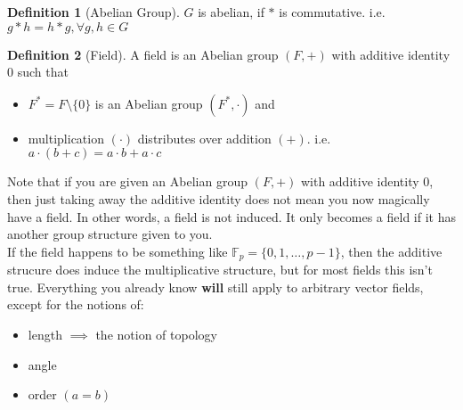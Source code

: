 \documentclass[12pt, a4paper, openany]{report}
\theoremstyle{definition}
\newtheorem{defn}{Definition}
\theoremstyle{remark}
\begin{document}
\begin{defn}[Abelian Group]
    \( G \) is abelian, if \( \ast \) is commutative. i.e. \( g \ast h = h \ast g, \forall g, h \in  G \)

\end{defn}

\begin{defn}[Field]
    A field is an Abelian group \( (F, +) \) with additive identity \( 0 \) such that
    \begin{itemize}
        \item \( F^{*} = F \setminus \{0\} \) is an Abelian group \( (F^{*}, \cdot) \) and
        \item multiplication \( (\cdot) \) distributes over addition \( (+) \). i.e. \( a \cdot (b + c) = a \cdot b + a \cdot c \)
    \end{itemize}
\end{defn}

Note that if you are given an Abelian group \( (F, +) \) with additive identity \( 0 \), then just taking away the additive identity does not mean you now magically have a field. In other words, a field is not induced.
It only becomes a field if it has another group structure given to you.\\

If the field happens to be something like \( \mathbb{F}_p = \{ 0, 1, \dots, p-1 \} \), then the additive strucure does induce the multiplicative structure, but for most fields this isn't true. Everything you already know
\textbf{will} still apply to arbitrary vector fields, except for the notions of:
\begin{itemize}
    \item length \( \implies \) the notion of topology
    \item angle
    \item order \( (a=b) \)
\end{itemize}
\end{document}
